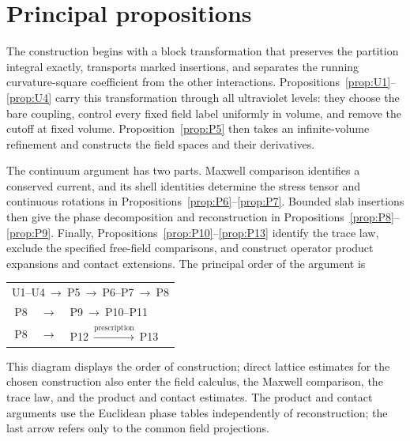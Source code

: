 \section{Principal propositions}\label{sec:principal-propositions}

The construction begins with a block transformation that preserves the partition
integral exactly, transports marked insertions, and separates the running
curvature-square coefficient from the other interactions.
Propositions~\ref{prop:U1}--\ref{prop:U4} carry this
transformation through all ultraviolet levels: they choose the bare coupling,
control every fixed field label uniformly in volume, and remove the cutoff at
fixed volume. Proposition~\ref{prop:P5} then takes an infinite-volume refinement
and constructs the field spaces and their derivatives.

The continuum argument has two parts. Maxwell comparison identifies a conserved
current, and its shell identities determine the stress tensor and continuous
rotations in Propositions~\ref{prop:P6}--\ref{prop:P7}. Bounded slab insertions
then give the phase decomposition and reconstruction in
Propositions~\ref{prop:P8}--\ref{prop:P9}. Finally,
Propositions~\ref{prop:P10}--\ref{prop:P13} identify the trace law, exclude the
specified free-field comparisons, and construct operator product expansions and
contact extensions. The principal order of the argument is
\begin{center}
\begin{tabular}{r@{\quad}c@{\quad}l}
\multicolumn{3}{c}{\textup{U1--U4}$\ \longrightarrow\ $\textup{P5}$\ \longrightarrow\ $\textup{P6--P7}$\ \longrightarrow\ $\textup{P8}} \\[2pt]
\textup{P8} & $\longrightarrow$ & \textup{P9}$\ \longrightarrow\ $\textup{P10--P11} \\[2pt]
\textup{P8} & $\longrightarrow$ & \textup{P12}$\ \xrightarrow{\text{prescription}}\ $\textup{P13}
\end{tabular}
\end{center}
This diagram displays the order of construction; direct lattice estimates for
the chosen construction also enter the field calculus, the Maxwell comparison,
the trace law, and the product and contact estimates. The product and contact
arguments use the Euclidean phase tables independently of reconstruction;
the last arrow refers only to the common field projections.

